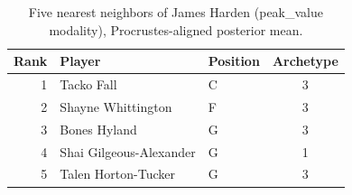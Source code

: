 \begin{table}[htbp]
  \centering\small
  \begin{tabular}{rllc}
    \toprule
    Rank & Player & Position & Archetype \\
    \midrule
    1 & Tacko Fall & C & 3 \\
    2 & Shayne Whittington & F & 3 \\
    3 & Bones Hyland & G & 3 \\
    4 & Shai Gilgeous-Alexander & G & 1 \\
    5 & Talen Horton-Tucker & G & 3 \\
    \bottomrule
  \end{tabular}
  \caption{Five nearest neighbors of James Harden (peak_value modality), Procrustes-aligned posterior mean.}
  \label{tab:James_Harden_neighbors_peak_value}
\end{table}

